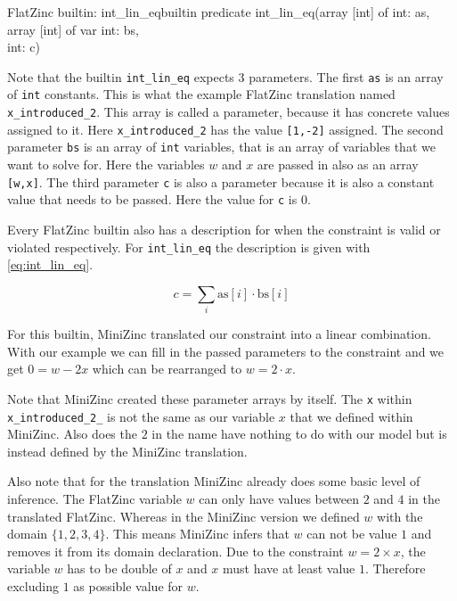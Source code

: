 \begin{example}{FlatZinc builtin: int\_lin\_eq}{builtin}
	predicate int\_lin\_eq(array [int] of int: as,\\
	\null \hspace*{2.95cm} array [int] of var int: bs,\\
	\null \hspace*{2.95cm} int: c)
\end{example}

Note that the builtin \verb|int_lin_eq| expects 3 parameters. The first \verb|as| is an array of \verb|int| constants. This is what the example FlatZinc translation named \verb|x_introduced_2|. This array is called a parameter, because it has concrete values assigned to it. Here \verb|x_introduced_2| has the value \verb|[1,-2]| assigned. The second parameter \verb|bs| is an array of \verb|int| variables, that is an array of variables that we want to solve for. Here the variables $w$ and $x$ are passed in also as an array \verb|[w,x]|. The third parameter \verb|c| is also a parameter because it is also a constant value that needs to be passed. Here the value for \verb|c| is $0$.

Every FlatZinc builtin also has a description for when the constraint is valid or violated respectively. For \verb|int_lin_eq| the description is given with \cref{eq:int_lin_eq}.

\begin{equation} \label{eq:int_lin_eq}
	c = \sum_{i} \text{as}[i] \cdot \text{bs}[i]
\end{equation}

For this builtin, MiniZinc translated our constraint into a linear combination. With our example we can fill in the passed parameters to the constraint and we get $0 = w - 2x$ which can be rearranged to $w = 2 \cdot x$.

Note that MiniZinc created these parameter arrays by itself. The \verb|x| within \verb|x_introduced_2_| is not the same as our variable $x$ that we defined within MiniZinc. Also does the $2$ in the name have nothing to do with our model but is instead defined by the MiniZinc translation.

Also note that for the translation MiniZinc already does some basic level of inference. The FlatZinc variable $w$ can only have values between $2$ and $4$ in the translated FlatZinc. Whereas in the MiniZinc version we defined $w$ with the domain $\{1, 2, 3, 4\}$. This means MiniZinc infers that $w$ can not be value $1$ and removes it from its domain declaration. Due to the constraint $w = 2 \times x$, the variable $w$ has to be double of $x$ and $x$ must have at least value $1$. Therefore excluding $1$ as possible value for $w$.

